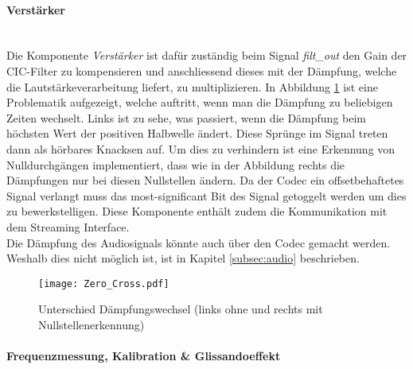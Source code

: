 \paragraph{Verstärker}\mbox{}\\

Die Komponente \textit{Verstärker} ist dafür zuständig beim Signal \textit{filt\_out} den Gain der CIC-Filter zu kompensieren und anschliessend dieses mit der Dämpfung, welche die Lautstärkeverarbeitung liefert, zu multiplizieren. In Abbildung \ref{img:Zero_Cross} ist eine Problematik aufgezeigt, welche auftritt, wenn man die Dämpfung zu beliebigen Zeiten wechselt. Links ist zu sehe, was passiert, wenn die Dämpfung beim höchsten Wert der positiven Halbwelle ändert. Diese Sprünge im Signal treten dann als hörbares Knacksen auf. Um dies zu verhindern ist eine Erkennung von Nulldurchgängen implementiert, dass wie in der Abbildung rechts die Dämpfungen nur bei diesen Nullstellen ändern. Da der Codec ein offsetbehaftetes Signal verlangt muss das most-significant Bit des Signal getoggelt werden um dies zu bewerkstelligen. Diese Komponente enthält zudem die Kommunikation mit dem Streaming Interface. \\
Die Dämpfung des Audiosignals könnte auch über den Codec gemacht werden. Weshalb dies nicht möglich ist, ist in Kapitel \ref{subsec:audio} beschrieben. 
	
\begin{figure}[h!]
	\centering
	\texttt{[image: Zero\_Cross.pdf]}
	\caption{Unterschied Dämpfungswechsel (links ohne und rechts mit Nullstellenerkennung)} 
	\label{img:Zero_Cross}
\end{figure}  

\newpage

\paragraph{Frequenzmessung, Kalibration \& Glissandoeffekt}\mbox{}\\

